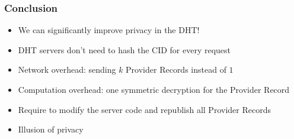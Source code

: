\documentclass{pl-slide}
\begin{document}
\begin{frame}
\end{frame}

\begin{frame}
\frametitle{Conclusion}
\begin{itemize}
	\item We can significantly improve privacy in the DHT!
	\item DHT servers don't need to hash the CID for every request
	\item Network overhead: sending $k$ Provider Records instead of $1$
	\item Computation overhead: one symmetric decryption for the Provider Record
	\item Require to modify the server code and republish all Provider Records
	\item Illusion of privacy
\end{itemize}
\end{frame}

\fi
\end{document}
